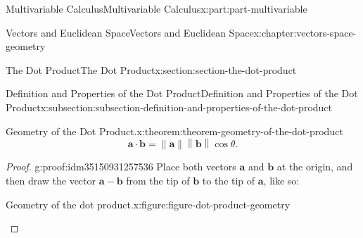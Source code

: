 \documentclass[twoside,10pt,]{tufte-book}
\numberwithin{equation}{part}
\newcommand{\norm}[1]{\left\| #1 \right\|}
\begin{document}
\begin{partptx}{Multivariable Calculus}{}{Multivariable Calculus}{}{}{x:part:part-multivariable}
\begin{chapterptx}{Vectors and Euclidean Space}{}{Vectors and Euclidean Space}{}{}{x:chapter:vectors-space-geometry}
\begin{sectionptx}{The Dot Product}{}{The Dot Product}{}{}{x:section:section-the-dot-product}
\begin{subsectionptx}{Definition and Properties of the Dot Product}{}{Definition and Properties of the Dot Product}{}{}{x:subsection:subsection-definition-and-properties-of-the-dot-product}
\begin{theorem}{Geometry of the Dot Product.}{}{x:theorem:theorem-geometry-of-the-dot-product}
%
\begin{equation*}
\mathbf{a}\cdot\mathbf{b} = \norm{\mathbf{a}}\norm{\mathbf{b}}\cos\theta.
\end{equation*}
\end{theorem}
\begin{proof}{}{g:proof:idm35150931257536}
Place both vectors \(\mathbf{a}\) and \(\mathbf{b}\) at the origin, and then draw the vector \(\mathbf{a}-\mathbf{b}\) from the tip of \(\mathbf{b}\) to the tip of \(\mathbf{a}\), like so:%
\begin{figureptx}{Geometry of the dot product.}{x:figure:figure-dot-product-geometry}{}%
\begin{image}{0.2}{0.6}{0.2}%
\end{image}
\end{figureptx}
\end{proof}
\end{subsectionptx}
\end{sectionptx}
\end{chapterptx}
\end{partptx}
\end{document}
